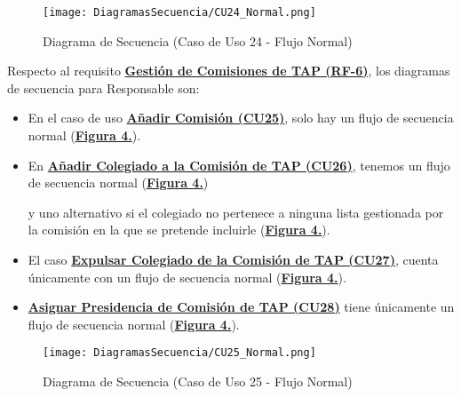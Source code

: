 \begin{landscape}
  \begin{figure}[!htbp]
    \centering
    \texttt{[image: DiagramasSecuencia/CU24\_Normal.png]}
    \caption{Diagrama de Secuencia (Caso de Uso 24 - Flujo Normal)}
    \label{fig:Secuencia_CU24_Normal}
  \end{figure}
\end{landscape}
\FloatBarrier


Respecto al requisito \textbf{\hyperref[tab:rfGestComTAP]{Gestión de Comisiones de TAP (RF-6)}}, los diagramas de secuencia para Responsable son:
\begin{itemize}
  \item \addtocounter{figura_cap4}{1} En el caso de uso \textbf{\hyperref[tab:curCrearComision]{Añadir Comisión (CU25)}}, solo hay un flujo de secuencia normal (\textbf{\hyperref[fig:Secuencia_CU25_Normal]{Figura 4.}}).
  \item \addtocounter{figura_cap4}{1} En \textbf{\hyperref[tab:curIncluirColegComisionTAP]{Añadir Colegiado a la Comisión de TAP (CU26)}}, tenemos un flujo de secuencia normal (\textbf{\hyperref[fig:Secuencia_CU26_Normal]{Figura 4.}}) \addtocounter{figura_cap4}{1} y uno alternativo si el colegiado no pertenece a ninguna lista gestionada por la comisión en la que se pretende incluirle (\textbf{\hyperref[fig:Secuencia_CU26_Alt1]{Figura 4.}}).
  \item \addtocounter{figura_cap4}{1} El caso \textbf{\hyperref[tab:curExpulsarColegComisionTAP]{Expulsar Colegiado de la Comisión de TAP (CU27)}}, cuenta únicamente con un flujo de secuencia normal (\textbf{\hyperref[fig:Secuencia_CU27_Normal]{Figura 4.}}).
  \item \addtocounter{figura_cap4}{1} \textbf{\hyperref[tab:curAsignarPresidenciaComisionTAP]{Asignar Presidencia de Comisión de TAP (CU28)}} tiene únicamente un flujo de secuencia normal (\textbf{\hyperref[fig:Secuencia_CU28_Normal]{Figura 4.}}).
\end{itemize}

\begin{landscape}
  \begin{figure}[!htbp]
    \centering
    \texttt{[image: DiagramasSecuencia/CU25\_Normal.png]}
    \caption{Diagrama de Secuencia (Caso de Uso 25 - Flujo Normal)}
    \label{fig:Secuencia_CU25_Normal}
  \end{figure}
\end{landscape}
\FloatBarrier

